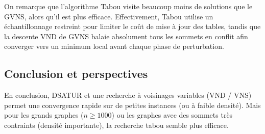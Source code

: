 \documentclass{article}
\begin{document}
On remarque que l'algorithme Tabou visite beaucoup moins de solutions que le GVNS, alors qu'il est plus efficace. Effectivement, Tabou utilise un échantillonnage restreint pour limiter le coût de mise à jour des tables, tandis que la descente VND de GVNS balaie absolument tous les sommets en conflit afin converger vers un minimum local avant chaque phase de perturbation.

\subsection{Conclusion et perspectives}
En conclusion, DSATUR et une recherche à voisinages variables (VND / VNS) permet une convergence rapide sur de petites instances (ou à faible densité). Mais pour les grands graphes ($n \ge 1000$) ou les graphes avec des sommets très contraints (densité importante), la recherche tabou semble plus efficace.
\end{document}
